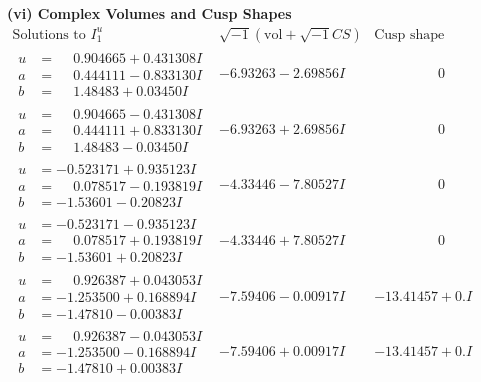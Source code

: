 \documentclass[1p]{elsarticle_modified}
\theoremstyle{definition}
\newcommand{\I}{\sqrt{-1}}
\begin{document}
\newpage\flushleft \textbf{(vi) Complex Volumes and Cusp Shapes}
$$\begin{array}{c|c|c}  
\text{Solutions to }I^u_{1}& \I (\text{vol} + \sqrt{-1}CS) & \text{Cusp shape}\\
 \hline 
\begin{aligned}
u &= \phantom{-}0.904665 + 0.431308 I \\
a &= \phantom{-}0.444111 - 0.833130 I \\
b &= \phantom{-}1.48483 + 0.03450 I\end{aligned}
 & -6.93263 - 2.69856 I & \phantom{-0.000000 } 0 \\ \hline\begin{aligned}
u &= \phantom{-}0.904665 - 0.431308 I \\
a &= \phantom{-}0.444111 + 0.833130 I \\
b &= \phantom{-}1.48483 - 0.03450 I\end{aligned}
 & -6.93263 + 2.69856 I & \phantom{-0.000000 } 0 \\ \hline\begin{aligned}
u &= -0.523171 + 0.935123 I \\
a &= \phantom{-}0.078517 - 0.193819 I \\
b &= -1.53601 - 0.20823 I\end{aligned}
 & -4.33446 - 7.80527 I & \phantom{-0.000000 } 0 \\ \hline\begin{aligned}
u &= -0.523171 - 0.935123 I \\
a &= \phantom{-}0.078517 + 0.193819 I \\
b &= -1.53601 + 0.20823 I\end{aligned}
 & -4.33446 + 7.80527 I & \phantom{-0.000000 } 0 \\ \hline\begin{aligned}
u &= \phantom{-}0.926387 + 0.043053 I \\
a &= -1.253500 + 0.168894 I \\
b &= -1.47810 - 0.00383 I\end{aligned}
 & -7.59406 - 0.00917 I & -13.41457 + 0. I\phantom{ +0.000000I} \\ \hline\begin{aligned}
u &= \phantom{-}0.926387 - 0.043053 I \\
a &= -1.253500 - 0.168894 I \\
b &= -1.47810 + 0.00383 I\end{aligned}
 & -7.59406 + 0.00917 I & -13.41457 + 0. I\phantom{ +0.000000I} \\ \hline\begin{aligned}

\end{aligned}
\end{array}$$
\end{document}
